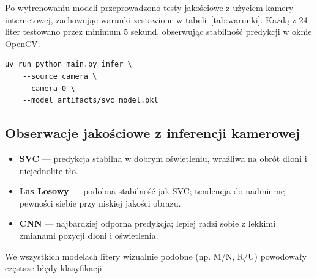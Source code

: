Po wytrenowaniu modeli przeprowadzono testy jakościowe z użyciem kamery
internetowej, zachowując warunki zestawione w tabeli~\ref{tab:warunki}.
Każdą z 24 liter testowano przez minimum 5 sekund, obserwując stabilność
predykcji w oknie OpenCV.

\begin{lstlisting}[style=styleBash, caption={Uruchomienie inferencji z kamery}, label=lst:infer-cam]
uv run python main.py infer \
    --source camera \
    --camera 0 \
    --model artifacts/svc_model.pkl
\end{lstlisting}

\subsection{Obserwacje jakościowe z inferencji kamerowej}

\begin{itemize}
    \item \textbf{SVC} --- predykcja stabilna w dobrym oświetleniu, wrażliwa
          na obrót dłoni i niejednolite tło.
    \item \textbf{Las Losowy} --- podobna stabilność jak SVC; tendencja do
          nadmiernej pewności siebie przy niskiej jakości obrazu.
    \item \textbf{CNN} --- najbardziej odporna predykcja; lepiej radzi sobie
          z lekkimi zmianami pozycji dłoni i oświetlenia.
\end{itemize}

We wszystkich modelach litery wizualnie podobne (np. M/N, R/U) powodowały
częstsze błędy klasyfikacji.